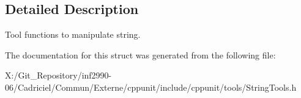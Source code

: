 \subsection{Detailed Description}
Tool functions to manipulate string. 

The documentation for this struct was generated from the following file\-:\begin{DoxyCompactItemize}
\item 
X\-:/\-Git\-\_\-\-Repository/inf2990-\/06/\-Cadriciel/\-Commun/\-Externe/cppunit/include/cppunit/tools/String\-Tools.\-h\end{DoxyCompactItemize}
